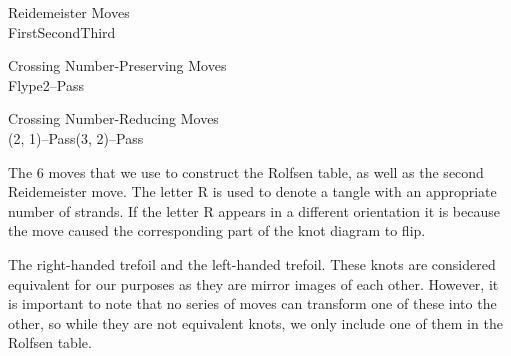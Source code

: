 \begin{paper}
\begin{center}\begin{minipage}{\columnwidth}\begin{center}
Reidemeister Moves\vspace{0.5em}
\\
First\hspace{0.14\columnwidth}Second\hspace{0.11\columnwidth}Third\\
\end{center}\end{minipage}\end{center}
\begin{center}\begin{minipage}{\columnwidth}\begin{center}
Crossing Number-Preserving Moves\vspace{0.5em}
\\
Flype\hspace{0.225\columnwidth}2--Pass\\
\end{center}\end{minipage}\end{center}
\begin{center}\begin{minipage}{\columnwidth}\begin{center}
Crossing Number-Reducing Moves\vspace{0.5em}
\\
(2, 1)--Pass\hspace{0.125\columnwidth}(3, 2)--Pass
\end{center}\end{minipage}\end{center}

{The 6 moves that we use to construct the Rolfsen table, as well as the second
Reidemeister move.
The letter R is used to denote a tangle with an appropriate number of strands.
If the letter R appears in a different orientation it is because the move caused
the corresponding part of the knot diagram to flip.}

{The right-handed trefoil and the left-handed trefoil.
These knots are considered equivalent for our purposes as they are mirror images
of each other.
However, it is important to note that no series of moves can transform one of
these into the other, so while they are not equivalent knots, we only include
one of them in the Rolfsen table.}


\end{paper}
